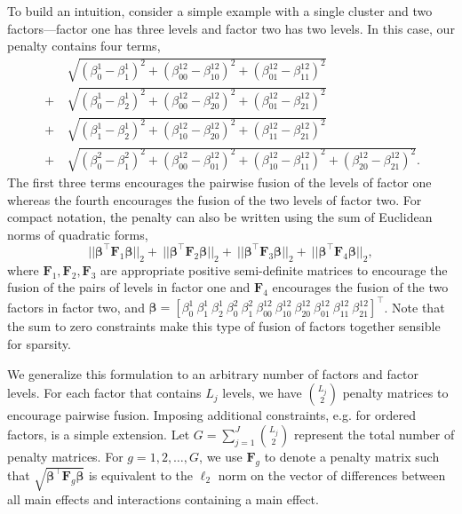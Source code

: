 \documentclass[11pt]{article}
\newcommand\bF{\bm{F}}
\newcommand\bbeta{\bm{\beta}}
\begin{document}
To build an intuition, consider a simple example with a single cluster
and two factors---factor one has three levels and factor two has two
levels.  In this case, our penalty contains four terms,
\begin{equation*}
\begin{split}
& \sqrt{(\beta^1_0 - \beta^1_1)^2 +  (\beta^{12}_{00} -
    \beta^{12}_{10})^2 + (\beta^{12}_{01} -
    \beta^{12}_{11})^2}\\
  ~+~ &\sqrt{(\beta^1_0 - \beta^1_2)^2 +
    (\beta^{12}_{00} - \beta^{12}_{20})^2 +
    (\beta^{12}_{01}-\beta^{12}_{21})^2}\\
~+~ & \sqrt{(\beta^1_1 - \beta^1_2)^2 + (\beta^{12}_{10} - \beta^{12}_{20})^2 + (\beta^{12}_{11} - \beta^{12}_{21})^2}\\
~+~ & \sqrt{(\beta^2_0 - \beta^2_1)^2 +  (\beta^{12}_{00}-\beta^{12}_{01})^2 + (\beta^{12}_{10} - \beta^{12}_{11})^2 + (\beta^{12}_{20}-\beta^{12}_{21})^2} .
\end{split}
\end{equation*}
The first three terms encourages the pairwise fusion of the levels of
factor one whereas the fourth encourages the fusion of the two levels
of factor two. For compact notation, the penalty can also be written
using the sum of Euclidean norms of quadratic forms,
\begin{equation*}
 || \bm{\beta}^\top \bm{F}_1 \bm{\beta} ||_2 +  \ ||
 \bm{\beta}^\top \bm{F}_2 \bm{\beta} ||_2 + \ ||
 \bm{\beta}^\top \bm{F}_3 \bm{\beta} ||_2 + \ ||
 \bm{\beta}^\top \bm{F}_4 \bm{\beta} ||_2,  
\end{equation*}
where $\bF_1, \bF_2, \bF_3$ are appropriate positive semi-definite
matrices to encourage the fusion of the pairs of levels in factor one
and $\bF_4$ encourages the fusion of the two factors in factor two,
and
$\bbeta = [\beta^1_0\ \beta^1_1\ \beta^1_2\ \beta^2_0\ \beta^2_1\
\beta^{12}_{00}\ \beta^{12}_{10}\ \beta^{12}_{20}\ \beta^{12}_{01}\
\beta^{12}_{11}\ \beta^{12}_{21}]^\top$.
Note that the sum to zero constraints make this type of fusion of factors together sensible for sparsity. 

We generalize this formulation to an arbitrary number of factors and
factor levels. For each factor that contains $L_j$ levels, we have
$\binom{L_j}{2}$ penalty matrices to encourage pairwise
fusion. Imposing additional constraints, e.g. for ordered factors, is
a simple extension. Let $G = \sum_{j=1}^J \binom{L_j}{2}$ represent
the total number of penalty matrices.  For $g=1,2,\ldots,G$, we use
$\bF_g$ to denote a penalty matrix such that
$\sqrt{\bbeta^\top\bF_{g}\bbeta}$ is equivalent to the $\ell_2$ norm
on the vector of differences between all main effects and interactions
containing a main effect.
\end{document}
